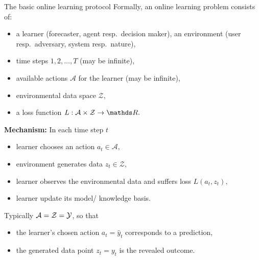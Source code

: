 \documentclass[11pt,compress,t,notes=noshow, xcolor=table]{beamer}
\renewcommand{\l}{L}
\begin{document}
\begin{frame}{The basic online learning protocol}
	\footnotesize
	Formally, an online learning problem consists of:
	\begin{itemize}\footnotesize
		 \item a learner (forecaster, agent resp.\ decision maker), an environment (user resp.\ adversary, system resp.\ nature),
		 \item time steps $1,2,\ldots,T$ (may be infinite),
		 \item available actions $\mathcal A$ for the learner (may be infinite),
		 \item environmental data space $\mathcal Z,$
		 \item a loss function $\l: \mathcal{A} \times \mathcal{Z} \to \R.$
	\end{itemize}
	{ {\textbf{Mechanism:} In each time step $t$
	\begin{itemize}\footnotesize
		 \item learner chooses an action $a_{t} \in \mathcal{A},$
		 \item environment generates data $z_{t} \in \mathcal{Z},$
		 \item learner observes the environmental data and suffers loss $\l(a_{t},z_{t}),$ 
		 \item learner update its model/ knowledge basis.
	\end{itemize}}}
	{ {	Typically $\mathcal{A} = \mathcal{Z} = \mathcal{Y}$, so that
	\begin{itemize}\footnotesize
		\item the learner's chosen action $a_{t} = \hat{y}_t$ corresponds to a prediction,
		\item the generated data point $z_{t} =y_t$ is the revealed outcome.
	\end{itemize}}}
\end{frame}
\end{document}
